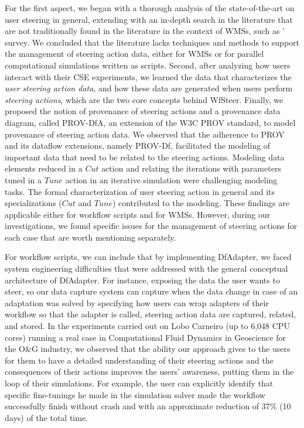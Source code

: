 For the first aspect, we began with a thorough analysis of the state-of-the-art on user steering in general, extending with an in-depth search in the literature that are not traditionally found in the literature in the context of WMSs, such as \citet{Mattoso2015Dynamic}' survey.
We concluded that the literature lacks techniques and methods to support the management of steering action data, either for WMSs or for parallel computational simulations written as scripts.
Second, after analyzing how users interact with their CSE experiments, we learned the data that characterizes the \textit{user steering action data}, and how these data are generated when users perform \textit{steering actions}, which are the two core concepts behind WfSteer.
Finally, we proposed the notion of provenance of steering actions and a provenance data diagram, called PROV-DfA, an extension of the W3C PROV standard, to model provenance of steering action data.
We observed that the adherence to PROV and its dataflow extensions, namely PROV-Df, facilitated the modeling of important data that need to be related to the steering actions. Modeling data elements reduced in a $Cut$ action and relating the iterations with parameters tuned in a $Tune$ action in an iterative simulation were challenging modeling tasks. The formal characterization of user steering action in general and its specializations ($Cut$ and $Tune$) contributed to the modeling.
These findings are applicable either for workflow scripts and for WMSs. However, during our investigations, we found 
specific issues for the management of steering actions for each case that are worth mentioning separately.

For workflow scripts, we can include that by implementing DfAdapter, we faced system engineering difficulties that were addressed with
the general conceptual architecture of DfAdapter.
For instance, exposing the data the user wants to steer, so our
data capture system can capture when the data change in case of an adaptation
was solved by specifying how users can wrap
adapters of their workflow so that the adapter is called, steering action data are
 captured, related, and stored. 
 In the experiments carried out on Lobo Carneiro (up to 6,048 CPU cores) running a real case in Computational Fluid Dynamics in Geoscience for the O\&G industry, we observed that the ability our approach gives to the users for them to have a detailed understanding of their steering actions and the consequences of their actions improves the users' awareness, putting them in the loop
of their simulations. For example, the user can explicitly
identify that specific fine-tunings he made in the simulation solver
made the workflow successfully finish without crash and
with an approximate reduction of 37\% (10 days) of the total time.

